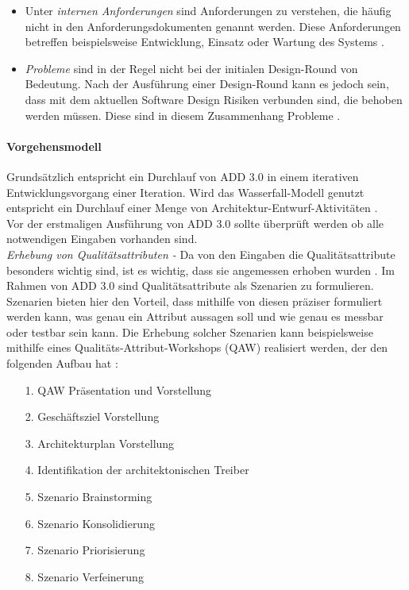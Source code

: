\begin{itemize}
\begin{itemize}
\item Unter \emph{internen Anforderungen} sind Anforderungen zu verstehen, die h\"aufig nicht in den Anforderungsdokumenten genannt werden. Diese Anforderungen betreffen beispielsweise Entwicklung, Einsatz oder Wartung des Systems \cite{Cer01}.  
\item \emph{Probleme} sind in der Regel nicht bei der initialen Design-Round von Bedeutung. Nach der Ausf\"uhrung einer Design-Round kann es jedoch sein, dass mit dem aktuellen Software Design Risiken verbunden sind, die behoben werden m\"ussen. Diese sind in diesem Zusammenhang Probleme \cite{Cer01}.\\
\end{itemize}
\end{itemize}

\paragraph{Vorgehensmodell}
Grunds\"atzlich entspricht ein Durchlauf von ADD 3.0 in einem iterativen Entwicklungsvorgang einer Iteration. Wird das Wasserfall-Modell genutzt entspricht ein Durchlauf einer Menge von Architektur-Entwurf-Aktivit\"aten \cite{Cer01}.\\

Vor der erstmaligen Ausf\"uhrung von ADD 3.0 sollte \"uberpr\"uft werden ob alle notwendigen Eingaben vorhanden sind.\\

\emph{Erhebung von Qualit\"atsattributen -}
Da von den Eingaben die Qualit\"atsattribute besonders wichtig sind, ist es wichtig, dass sie angemessen erhoben wurden \cite{Cer01}. Im Rahmen von ADD 3.0 sind Qualit\"atsattribute als Szenarien zu formulieren. Szenarien bieten hier den Vorteil, dass mithilfe von diesen pr\"aziser formuliert werden kann, was genau ein Attribut aussagen soll und wie genau es messbar oder testbar sein kann. Die Erhebung solcher Szenarien kann beispielsweise mithilfe eines Qualit\"ats-Attribut-Workshops (QAW) realisiert werden, der den folgenden Aufbau hat \cite{Cer01}:\\

\begin{itemize}
\item[1.] QAW Pr\"asentation und Vorstellung
\item[2.] Gesch\"aftsziel Vorstellung
\item[3.] Architekturplan Vorstellung
\item[4.] Identifikation der architektonischen Treiber
\item[5.] Szenario Brainstorming
\item[6.] Szenario Konsolidierung
\item[7.] Szenario Priorisierung
\item[8.] Szenario Verfeinerung \\
\end{itemize}

